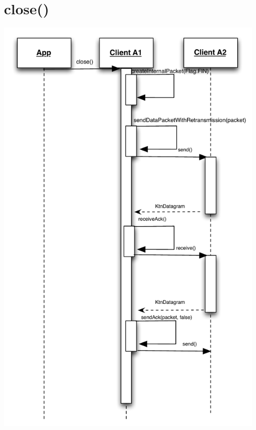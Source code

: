 \documentclass{article}
\begin{document}
\section{close()}
\includegraphics[scale=0.8]{ktnClientClose.pdf}
\end{document}
